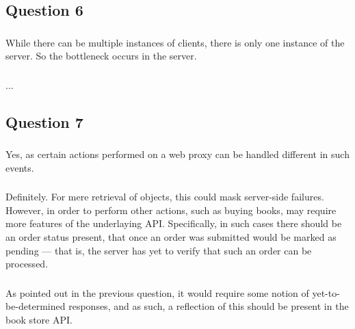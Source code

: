 \subsection{Question 6}

\subsubsection{}
While there can be multiple instances of clients, there is only one instance of
the server. So the bottleneck occurs in the server.

\subsubsection{}
...

\subsection{Question 7}

\subsubsection{}
Yes, as certain actions performed on a web proxy can be handled different in
such events.

\subsubsection{}
Definitely. For mere retrieval of objects, this could mask server-side
failures. However, in order to perform other actions, such as buying books,
may require more features of the underlaying API. Specifically, in such cases
there should be an order status present, that once an order was submitted would
be marked as pending --- that is, the server has yet to verify that such an
order can be processed.

\subsubsection{}
As pointed out in the previous question, it would require some notion of
yet-to-be-determined responses, and as such, a reflection of this should be
present in the book store API.



